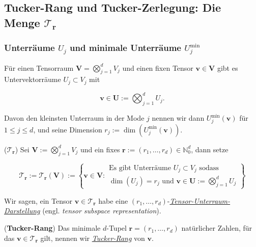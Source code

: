 \documentclass[11pt]{article} %
\begin{document}
\subsection{Tucker-Rang und Tucker-Zerlegung: Die Menge $\mathcal{T}_{\mathbf{r}}$}

\subsubsection{Unterräume $U_{j}$ und minimale Unterräume $U_{j}^{\min}$}
\begin{changemargin}{0pt}{0pt}

Für einen Tensorraum $\mathbf{V} = \bigotimes^{d}_{j=1} V_{j}$ und einen fixen Tensor $\mathbf{v} \in \mathbf{V}$ gibt es
Untervektorräume $U_{j} \subset V_{j}$ mit

\begin{equation}
\mathbf{v} \in \mathbf{U} := \bigotimes^{d}_{j=1} U_{j}.
\end{equation}

Davon den kleinsten Unterraum in der Mode $j$ nennen wir dann $U^{\min}_{j}(\mathbf{v})$ für $1\leq j\leq d$, und seine Dimension
$r_{j} := \dim(U_{j}^{\min}(\mathbf{v})).$

\begin{definition}($\mathcal{T}_{\mathbf{r}}$)
Sei $\mathbf{V} := \bigotimes^{d}_{j=1} V_{j}$ und ein fixes $\mathbf{r} := (r_{1},\dots,r_{d})\in \mathbb{N}^{d}_{0}$, dann setze

\begin{equation}
\mathcal{T}_{\mathbf{r}} := \mathcal{T}_{\mathbf{r}}(\mathbf{V}) := 
\left\{ \mathbf{v}\in \mathbf{V} : 
\begin{aligned}
\text{Es gibt Unterräume } U_{j} \subset V_{j} \text{ sodass }\\
\dim(U_{j}) = r_{j} \text{ und } \mathbf{v} \in \mathbf{U} := \bigotimes^{d}_{j=1} U_{j}
\end{aligned} 
\right\}
\end{equation}
\end{definition}

Wir sagen, ein Tensor $\mathbf{v} \in \mathcal{T}_{\mathbf{r}}$ habe eine $(r_{1},\dots,r_{d})$-\textit{\underline{Tensor-Unterraum-Darstellung}}
(engl. \textit{tensor subspace representation}).

\begin{definition} (\textbf{Tucker-Rang})
Das minimale $d$-Tupel $\mathbf{r} = (r_{1},\dots,r_{d})$ natürlicher Zahlen, für das $\mathbf{v} \in \mathcal{T}_{\mathbf{r}}$ gilt, nennen wir
\textit{\underline{Tucker-Rang}} von $\mathbf{v}$.
\end{definition}

\end{changemargin}
\end{document}
